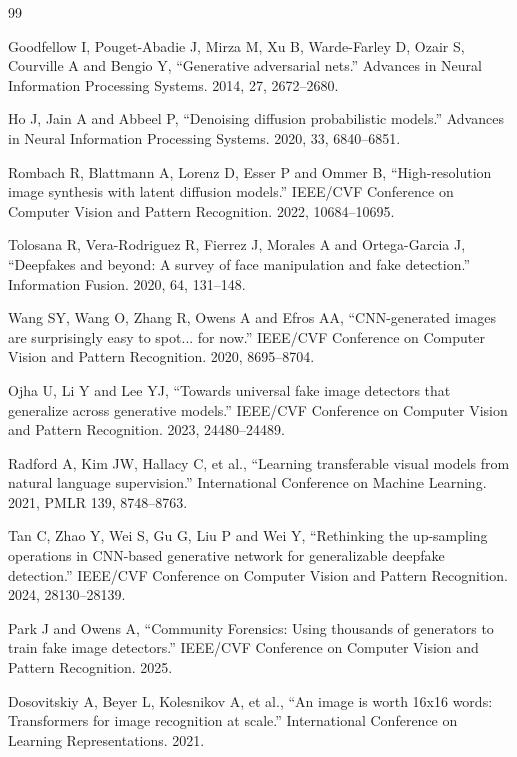 \documentclass[12pt,a4paper,oneside]{report}
\begin{document}
\begin{thebibliography}{99}
\setlength{\itemsep}{2pt}

 Goodfellow I, Pouget-Abadie J, Mirza M, Xu B, Warde-Farley D, Ozair S, Courville A and Bengio Y, ``Generative adversarial nets.'' Advances in Neural Information Processing Systems. 2014, 27, 2672--2680.

 Ho J, Jain A and Abbeel P, ``Denoising diffusion probabilistic models.'' Advances in Neural Information Processing Systems. 2020, 33, 6840--6851.

 Rombach R, Blattmann A, Lorenz D, Esser P and Ommer B, ``High-resolution image synthesis with latent diffusion models.'' IEEE/CVF Conference on Computer Vision and Pattern Recognition. 2022, 10684--10695.

 Tolosana R, Vera-Rodriguez R, Fierrez J, Morales A and Ortega-Garcia J, ``Deepfakes and beyond: A survey of face manipulation and fake detection.'' Information Fusion. 2020, 64, 131--148.

 Wang SY, Wang O, Zhang R, Owens A and Efros AA, ``CNN-generated images are surprisingly easy to spot... for now.'' IEEE/CVF Conference on Computer Vision and Pattern Recognition. 2020, 8695--8704.

 Ojha U, Li Y and Lee YJ, ``Towards universal fake image detectors that generalize across generative models.'' IEEE/CVF Conference on Computer Vision and Pattern Recognition. 2023, 24480--24489.

 Radford A, Kim JW, Hallacy C, et al., ``Learning transferable visual models from natural language supervision.'' International Conference on Machine Learning. 2021, PMLR 139, 8748--8763.

 Tan C, Zhao Y, Wei S, Gu G, Liu P and Wei Y, ``Rethinking the up-sampling operations in CNN-based generative network for generalizable deepfake detection.'' IEEE/CVF Conference on Computer Vision and Pattern Recognition. 2024, 28130--28139.

 Park J and Owens A, ``Community Forensics: Using thousands of generators to train fake image detectors.'' IEEE/CVF Conference on Computer Vision and Pattern Recognition. 2025.

 Dosovitskiy A, Beyer L, Kolesnikov A, et al., ``An image is worth 16x16 words: Transformers for image recognition at scale.'' International Conference on Learning Representations. 2021.


\end{thebibliography}
\end{document}
